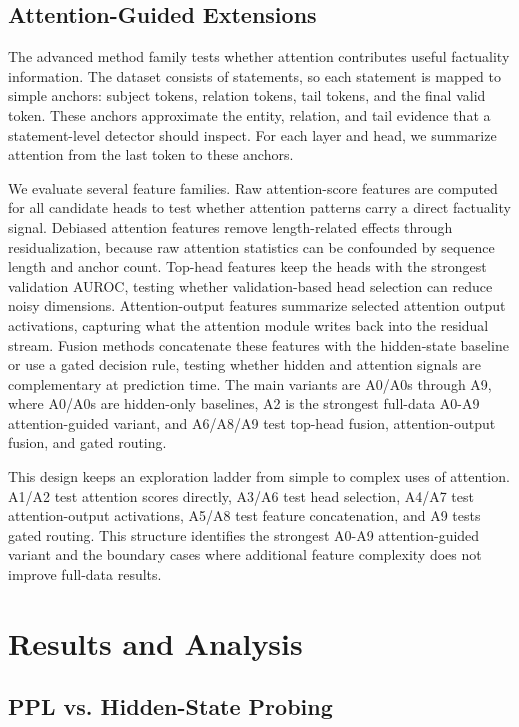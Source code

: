\documentclass[11pt]{article}
\begin{document}
\subsection{Attention-Guided Extensions}

The advanced method family tests whether attention contributes useful factuality information. The dataset consists of statements, so each statement is mapped to simple anchors: subject tokens, relation tokens, tail tokens, and the final valid token. These anchors approximate the entity, relation, and tail evidence that a statement-level detector should inspect. For each layer and head, we summarize attention from the last token to these anchors.

We evaluate several feature families. Raw attention-score features are computed for all candidate heads to test whether attention patterns carry a direct factuality signal. Debiased attention features remove length-related effects through residualization, because raw attention statistics can be confounded by sequence length and anchor count. Top-head features keep the heads with the strongest validation AUROC, testing whether validation-based head selection can reduce noisy dimensions. Attention-output features summarize selected attention output activations, capturing what the attention module writes back into the residual stream. Fusion methods concatenate these features with the hidden-state baseline or use a gated decision rule, testing whether hidden and attention signals are complementary at prediction time. The main variants are A0/A0s through A9, where A0/A0s are hidden-only baselines, A2 is the strongest full-data A0-A9 attention-guided variant, and A6/A8/A9 test top-head fusion, attention-output fusion, and gated routing.

This design keeps an exploration ladder from simple to complex uses of attention. A1/A2 test attention scores directly, A3/A6 test head selection, A4/A7 test attention-output activations, A5/A8 test feature concatenation, and A9 tests gated routing. This structure identifies the strongest A0-A9 attention-guided variant and the boundary cases where additional feature complexity does not improve full-data results.

\section{Results and Analysis}

\subsection{PPL vs. Hidden-State Probing}
\end{document}
